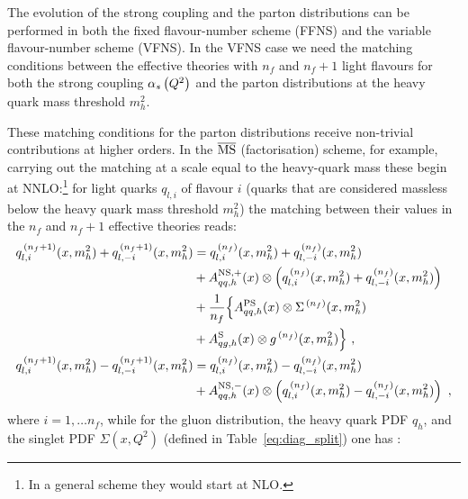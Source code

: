 The evolution of the strong coupling and the parton distributions can
be performed in both the fixed flavour-number scheme (FFNS) and the 
variable flavour-number scheme (VFNS). In the VFNS case we 
need the matching conditions between the effective
theories with $n_f$ and $n_{f}+1$ light flavours for both the strong 
coupling $\alpha_s\left( Q^2 \right)$ and the parton distributions at the heavy quark
mass threshold $m_h^2$.

These matching conditions for the parton distributions
receive non-trivial contributions at higher orders. In the $\overline{\mathrm{MS}}$
(factorisation) scheme, for example,
carrying out the matching at a scale equal to the heavy-quark mass
these begin at NNLO:\footnote{In
  a general scheme they would start at NLO.} %
for light quarks $q_{l,i}$ of flavour $i$ 
(quarks that are considered massless
below the heavy quark mass threshold $m_h^2$) the matching between
their values in the $n_f$ and
$n_f+1$ effective theories reads:
\begin{align}
\label{eq:lp-nf1}
  q_{l,i}^{\,(n_f+1)}(x,m_h^2) + q_{l,-i}^{\,(n_f+1)}(x,m_h^2)  & =   q_{l,i}^{\,(n_f)}(x,m_h^2) + q_{l,-i}^{\,(n_f)}(x,m_h^2) \notag \\ &+
   A^{\rm NS,+}_{qq,h}(x) \otimes \left(
   q_{l,i}^{\, (n_f)}(x,m_h^2) + q_{l,-i}^{\, (n_f)}(x,m_h^2)\right) \notag\\
   & + \frac{1}{n_f} \Big\{A^{\rm PS}_{qq,h}(x) \otimes \Sigma^{\, (n_f)}(x,m_h^2) \notag\\
   & + A^{\rm S}_{qg,h}(x) \otimes g^{\, (n_f)}(x,m_h^2)\Big\} \ , \notag \\
  q_{l,i}^{\,(n_f+1)}(x,m_h^2) - q_{l,-i}^{\,(n_f+1)}(x,m_h^2)  & =   q_{l,i}^{\,(n_f)}(x,m_h^2) - q_{l,-i}^{\,(n_f)}(x,m_h^2) \notag \\ &+
   A^{\rm NS,-}_{qq,h}(x) \otimes \left(
   q_{l,i}^{\, (n_f)}(x,m_h^2) - q_{l,-i}^{\, (n_f)}(x,m_h^2)\right) \ ,
\end{align}
where $i = 1,\ldots n_f$, while for the gluon distribution, the heavy
quark PDF $q_h$, and the singlet PDF $\Sigma(x,Q^2)$ (defined in
Table~\ref{eq:diag_split}) one has :
